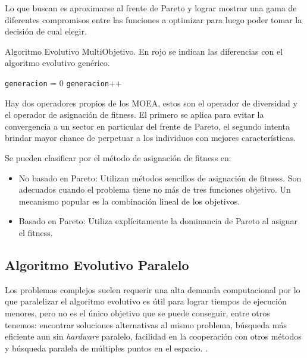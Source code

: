 Lo que buscan es aproximarse al frente de Pareto y lograr mostrar una gama de diferentes compromisos entre las funciones a optimizar para luego poder tomar la decisión de cual elegir.


\begin{algorithm}%
	\caption{Algoritmo Evolutivo MultiObjetivo. En rojo se indican las diferencias con el algoritmo evolutivo genérico.}
	\label{alg:algoritmo_genetico_multiobjetivo}
	\begin{algorithmic} [1] 
		{
			\STATE \texttt{generacion} = 0
			\STATE {\textcolor{red}{Operador Diversidad (Pob(generacion))}}
			\STATE {\textcolor{red}{Asignar Fitness (Pob(generacion))}}
			\STATE \texttt{generacion}++
			\ENDWHILE
			\RETURN 	{\textcolor{red}{Frente de Pareto}}
		}
	\end{algorithmic}
\end{algorithm}

Hay dos operadores propios de los MOEA, estos son el operador de diversidad y el operador de asignación de fitness. El primero se aplica para evitar la convergencia a un sector en particular del frente de Pareto, el segundo intenta brindar mayor chance de perpetuar a los individuos con mejores características.

Se pueden clasificar por el método de asignación de fitness en:
\begin{itemize}
	\item No basado en Pareto: Utilizan métodos sencillos de asignación de fitness. Son adecuados cuando el problema tiene no más de tres funciones objetivo. Un mecanismo popular es la combinación lineal de los objetivos.
	\item Basado en Pareto: Utiliza explícitamente la dominancia de Pareto al asignar el fitness.
\end{itemize}



\subsection{Algoritmo Evolutivo Paralelo}
Los problemas complejos suelen requerir una alta demanda computacional por lo que paralelizar el algoritmo evolutivo es útil para lograr tiempos de ejecución menores, pero no es el único objetivo que se puede conseguir, entre otros tenemos:  encontrar soluciones alternativas al mismo problema, búsqueda más eficiente aun sin \emph{hardware} paralelo, facilidad en la cooperación con otros métodos y búsqueda paralela de múltiples puntos en el espacio. \citep{Alba2002}. 


